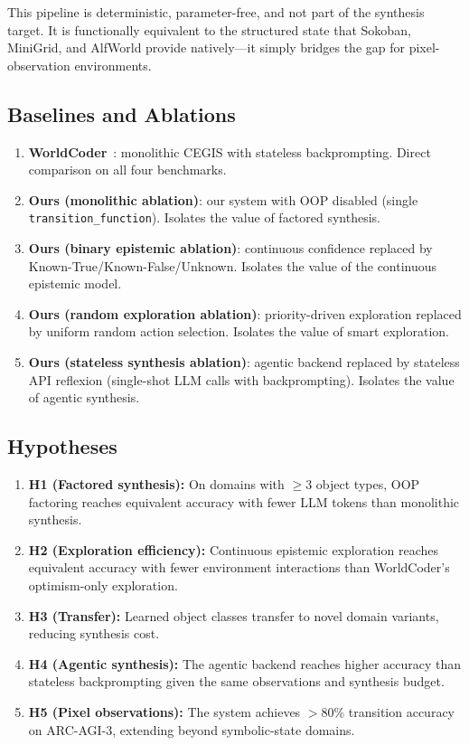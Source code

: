 \documentclass{article}
\begin{document}
This pipeline is deterministic, parameter-free, and not part of the synthesis
target.  It is functionally equivalent to the structured state that Sokoban,
MiniGrid, and AlfWorld provide natively---it simply bridges the gap for
pixel-observation environments.

\subsection{Baselines and Ablations}
\label{sec:baselines}

\begin{enumerate}[nosep]
    \item \textbf{WorldCoder}~\cite{tang2024worldcoder}: monolithic CEGIS
          with stateless backprompting.
          Direct comparison on all four benchmarks.
    \item \textbf{Ours (monolithic ablation)}: our system with OOP disabled
          (single \texttt{transition\_function}).  Isolates the value of
          factored synthesis.
    \item \textbf{Ours (binary epistemic ablation)}: continuous confidence
          replaced by Known-True/Known-False/Unknown.  Isolates the value
          of the continuous epistemic model.
    \item \textbf{Ours (random exploration ablation)}: priority-driven
          exploration replaced by uniform random action selection.  Isolates
          the value of smart exploration.
    \item \textbf{Ours (stateless synthesis ablation)}: agentic backend
          replaced by stateless API reflexion (single-shot LLM calls with
          backprompting).  Isolates the value of agentic synthesis.
\end{enumerate}

\subsection{Hypotheses}
\label{sec:hypotheses}

\begin{enumerate}[nosep]
    \item \textbf{H1 (Factored synthesis):} On domains with $\geq$3 object
          types, OOP factoring reaches equivalent accuracy with fewer LLM
          tokens than monolithic synthesis.
    \item \textbf{H2 (Exploration efficiency):} Continuous epistemic
          exploration reaches equivalent accuracy with fewer environment
          interactions than WorldCoder's optimism-only exploration.
    \item \textbf{H3 (Transfer):} Learned object classes transfer to novel
          domain variants, reducing synthesis cost.
    \item \textbf{H4 (Agentic synthesis):} The agentic backend reaches higher
          accuracy than stateless backprompting given the same observations
          and synthesis budget.
    \item \textbf{H5 (Pixel observations):} The system achieves $>$80\%
          transition accuracy on ARC-AGI-3, extending beyond symbolic-state
          domains.
\end{enumerate}
\end{document}
